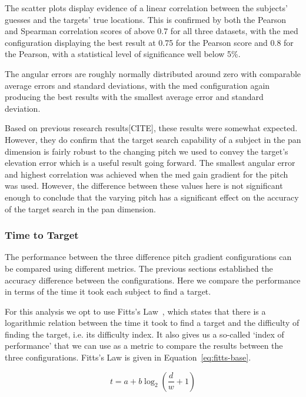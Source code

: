 \documentclass[format=sigconf, review=true, screen=true, anonymous=true]{acmart}
\begin{document}
The scatter plots display evidence of a linear correlation between the subjects' guesses and the targets' true locations. This is confirmed by both the Pearson and Spearman correlation scores of above 0.7 for all three datasets, with the med configuration displaying the best result at 0.75 for the Pearson score and 0.8 for the Pearson, with a statistical level of significance well below 5\%. 

The angular errors are roughly normally distributed around zero with comparable average errors and standard deviations, with the med configuration again producing the best results with the smallest average error and standard deviation. 

Based on previous research results[CITE], these results were somewhat expected. However, they do confirm that the target search capability of a subject in the pan dimension is fairly robust to the changing pitch we used to convey the target's elevation error which is a useful result going forward. The smallest angular error and highest correlation was achieved when the med gain gradient for the pitch was used. However, the difference between these values here is not significant enough to conclude that the varying pitch has a significant effect on the accuracy of the target search in the pan dimension. 

\subsubsection{Time to Target}

The performance between the three difference pitch gradient configurations can be compared using different metrics. The previous sections established the accuracy difference between the configurations. Here we compare the performance in terms of the time it took each subject to find a target. 

For this analysis we opt to use Fitts's Law~\cite{fitts1954information}, which states that there is a logarithmic relation between the time it took to find a target and the difficulty of finding the target, i.e. its difficulty index. It also gives us a so-called `index of performance' that we can use as a metric to compare the results between the three configurations. Fitts's Law is given in Equation~\ref{eq:fitts-base}. 

\begin{equation}
  \label{eq:fitts-base}
  t = a + b\log_2\left(\frac{d}{w} + 1\right)
\end{equation}
\end{document}
